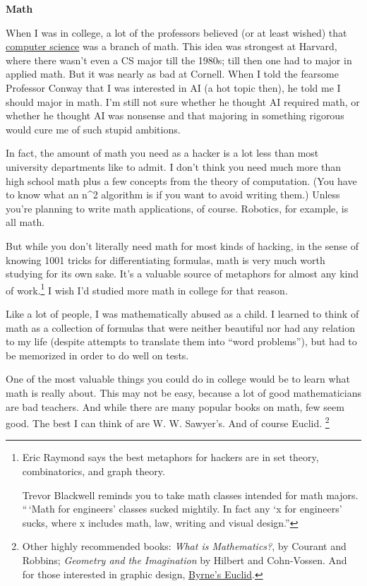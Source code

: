 \documentclass[12pt]{book}
\begin{document}
\textbf{Math}

When I was in college, a lot of the professors believed (or at least
wished) that \href{hp.html}{computer science} was a branch of math. This
idea was strongest at Harvard, where there wasn't even a CS major till
the 1980s; till then one had to major in applied math. But it was nearly
as bad at Cornell. When I told the fearsome Professor Conway that I was
interested in AI (a hot topic then), he told me I should major in math.
I'm still not sure whether he thought AI required math, or whether he
thought AI was nonsense and that majoring in something rigorous would
cure me of such stupid ambitions.

In fact, the amount of math you need as a hacker is a lot less than most
university departments like to admit. I don't think you need much more
than high school math plus a few concepts from the theory of
computation. (You have to know what an n\^{}2 algorithm is if you want
to avoid writing them.) Unless you're planning to write math
applications, of course. Robotics, for example, is all math.

But while you don't literally need math for most kinds of hacking, in
the sense of knowing 1001 tricks for differentiating formulas, math is
very much worth studying for its own sake. It's a valuable source of
metaphors for almost any kind of work.\footnote{Eric Raymond says the best metaphors for hackers are in set
theory, combinatorics, and graph theory.

Trevor Blackwell reminds you to take math classes intended for math
majors. ``\,`Math for engineers' classes sucked mightily. In fact any `x
for engineers' sucks, where x includes math, law, writing and visual
design.''} I wish I'd studied more
math in college for that reason.

Like a lot of people, I was mathematically abused as a child. I learned
to think of math as a collection of formulas that were neither beautiful
nor had any relation to my life (despite attempts to translate them into
``word problems''), but had to be memorized in order to do well on
tests.

One of the most valuable things you could do in college would be to
learn what math is really about. This may not be easy, because a lot of
good mathematicians are bad teachers. And while there are many popular
books on math, few seem good. The best I can think of are W. W.
Sawyer's. And of course Euclid. \footnote{Other highly recommended books: \emph{What is Mathematics?}, by
Courant and Robbins; \emph{Geometry and the Imagination} by Hilbert and
Cohn-Vossen. And for those interested in graphic design,
\href{http://www.math.ubc.ca/people/faculty/cass/Euclid/byrne.html}{Byrne's
Euclid}.}
\end{document}
